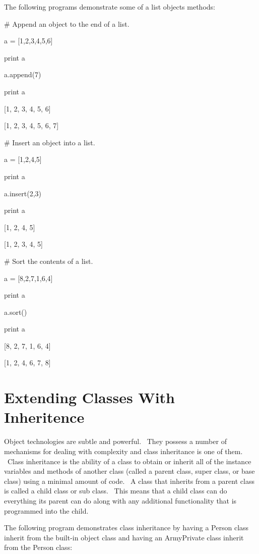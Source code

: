 \documentclass[12pt,twoside]{book}
\begin{document}
The following programs demonstrate some of a list object{\textquotesingle}s methods: 

\bigskip

\# Append an object to the end of a list.

a = [1,2,3,4,5,6]

print a

a.append(7)

print a

{\textbar}

[1, 2, 3, 4, 5, 6]

[1, 2, 3, 4, 5, 6, 7]


\bigskip

\# Insert an object into a list.

a = [1,2,4,5]

print a

a.insert(2,3)

print a

{\textbar}

[1, 2, 4, 5]

[1, 2, 3, 4, 5]

\# Sort the contents of a list.

a = [8,2,7,1,6,4]

print a

a.sort()

print a

{\textbar}

[8, 2, 7, 1, 6, 4]

[1, 2, 4, 6, 7, 8]

\section[Extending Classes With Inheritence]{ Extending Classes With Inheritence}

Object technologies are subtle and powerful. \ They possess a number of mechanisms for dealing with complexity and class inheritance is one of them. \ Class inheritance is the ability of a class to obtain or inherit all of the instance variables and methods of another class (called a parent class, super class, or base class) using a minimal amount of code. \ A class that inherits from a parent class is called a child class or sub class. \ This means that a child class can do everything its parent can do along with any additional functionality that is programmed into the child. \  

\bigskip

The following program demonstrates class inheritance by having a Person class inherit from the built{}-in object class and having an ArmyPrivate class inherit from the Person class: 
\end{document}
